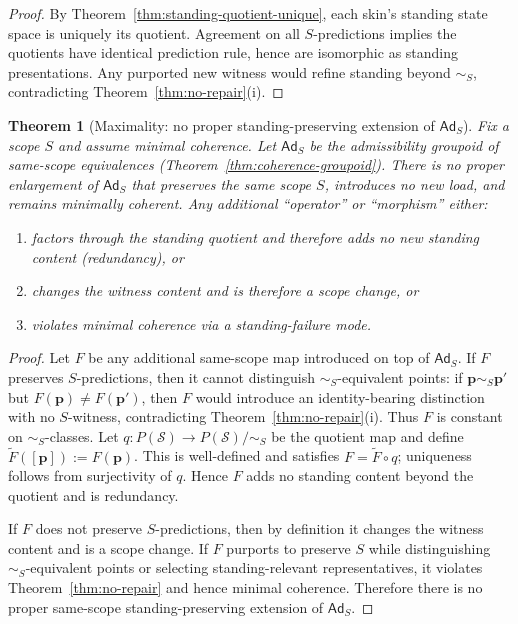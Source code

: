 \documentclass[11pt]{article}
\newtheorem{theorem}[definition]{Theorem}
\theoremstyle{remark}
\newcommand{\Skin}{\mathcal{S}}
\newcommand{\Ad}{\ensuremath{\mathsf{Ad}}}
\begin{document}
\begin{proof}
By Theorem~\ref{thm:standing-quotient-unique}, each skin's standing state space is uniquely its quotient.
Agreement on all $S$-predictions implies the quotients have identical prediction rule, hence are isomorphic as
standing presentations. Any purported new witness would refine standing beyond $\sim_S$, contradicting
Theorem~\ref{thm:no-repair}(i).
\end{proof}

\begin{theorem}[Maximality: no proper standing-preserving extension of $\Ad_S$]\label{thm:maximality}
Fix a scope $S$ and assume minimal coherence.
Let $\Ad_S$ be the admissibility groupoid of same-scope equivalences (Theorem~\ref{thm:coherence-groupoid}).
There is no proper enlargement of $\Ad_S$ that preserves the same scope $S$, introduces no new load,
and remains minimally coherent. Any additional ``operator'' or ``morphism'' either:
\begin{enumerate}[label=(\roman*),leftmargin=2.2em]
\item factors through the standing quotient and therefore adds no new standing content (redundancy), or
\item changes the witness content and is therefore a scope change, or
\item violates minimal coherence via a standing-failure mode.
\end{enumerate}
\end{theorem}

\begin{proof}
Let $F$ be any additional same-scope map introduced on top of $\Ad_S$.
If $F$ preserves $S$-predictions, then it cannot distinguish $\sim_S$-equivalent points: if
$\mathbf{p}\sim_S\mathbf{p}'$ but $F(\mathbf{p})\neq F(\mathbf{p}')$, then $F$ would introduce an identity-bearing
distinction with no $S$-witness, contradicting Theorem~\ref{thm:no-repair}(i). Thus $F$ is constant on
$\sim_S$-classes. Let $q:P(\Skin)\to P(\Skin)/\!\sim_S$ be the quotient map and define
$\widetilde F([\mathbf{p}]):=F(\mathbf{p})$. This is well-defined and satisfies $F=\widetilde F\circ q$; uniqueness
follows from surjectivity of $q$. Hence $F$ adds no standing content beyond the quotient and is redundancy.

If $F$ does not preserve $S$-predictions, then by definition it changes the witness content and is a scope change.
If $F$ purports to preserve $S$ while distinguishing $\sim_S$-equivalent points or selecting standing-relevant
representatives, it violates Theorem~\ref{thm:no-repair} and hence minimal coherence.
Therefore there is no proper same-scope standing-preserving extension of $\Ad_S$.
\end{proof}
\end{document}
